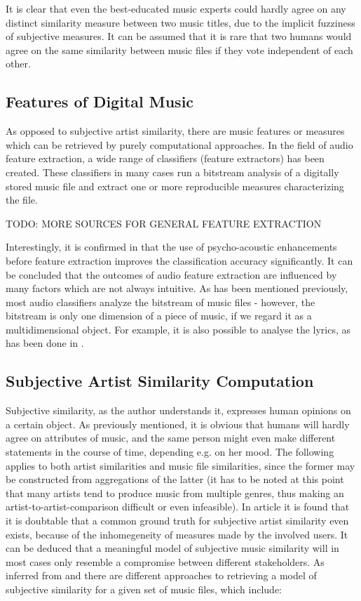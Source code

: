 It is clear that even the best-educated music experts could hardly agree on 
any distinct similarity measure between two music titles, due to the implicit fuzziness of subjective measures.
It can be assumed that it is rare that two humans would agree on the same similarity between music files
if they vote independent of each other.

\subsection{Features of Digital Music}

As opposed to subjective artist similarity, there are music features or measures which can be retrieved by
purely computational approaches. In the field of audio feature extraction, a wide range of classifiers
(feature extractors) has been created. These classifiers in many cases run a bitstream analysis of a digitally
stored music file and extract one or more reproducible measures characterizing the file. 



TODO: MORE SOURCES FOR GENERAL FEATURE EXTRACTION



Interestingly, it is confirmed in \cite{LID_05ismir} that the use of psycho-acoustic enhancements before
feature extraction improves the classification accuracy significantly. It can be concluded that the outcomes of
audio feature extraction are influenced by many factors which are not always intuitive.
As has been mentioned previously, most audio classifiers analyze the bitstream of music files - however,
the bitstream is only one dimension of a piece of music, if we regard it as a multidimensional object. For example,
it is also possible to analyse the lyrics, as has been done in \cite{DBLP:conf/ismir/MayerNR08}.

\subsection{Subjective Artist Similarity Computation}

Subjective similarity, as the author understands it, expresses human opinions on a certain object. As previously
mentioned, it is obvious that humans will hardly agree on attributes of music, and the same person might even make
different statements in the course of time, depending e.g. on her mood. The following applies to both artist 
similarities and music file similarities, since the former may be constructed from aggregations of the latter 
(it has to be noted at this point that many artists tend to produce music from multiple genres, thus making
an artist-to-artist-comparison difficult or even infeasible).
In article \cite{Ellis02thequest} it is found that it is doubtable that a common ground truth for subjective
artist similarity even exists, because of the inhomegeneity of measures made by the involved users. It can be
deduced that a meaningful model of subjective music similarity will in most cases only resemble a compromise
between different stakeholders.
As inferred from \cite{Berenzweig03alarge-scale} and \cite{mcfee09_hesas} there are different approaches to 
retrieving a model of subjective similarity for a given set of music files, which include:

